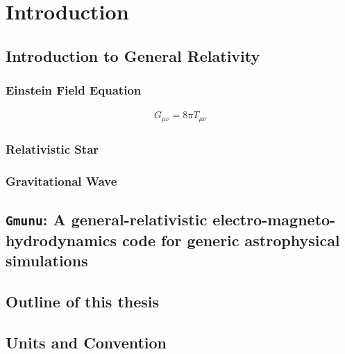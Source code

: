
\chapter{Introduction}  %

\ifpdf
    \graphicspath{{Chapter1/Figs/PDF/}{Chapter1/Figs/}}
\else
    \graphicspath{{Chapter1/Figs/}}
\fi


\section{Introduction to General Relativity} %
\label{section1.1}

\subsection{Einstein Field Equation} %
\label{section1.1.1}

\begin{align} \label{eq:Einstein_eq}
    G_{\mu\nu} = 8 \pi T_{\mu\nu}
\end{align}

\subsection{Relativistic Star} %
\label{section1.1.2}

\subsection{Gravitational Wave} %
\label{section1.1.3}

\section{\texttt{Gmunu}: A general-relativistic electro-magneto-hydrodynamics code for generic astrophysical simulations} %

\section{Outline of this thesis}  %
\label{section1.3}

\section{Units and Convention}  %
\label{section1.4}

